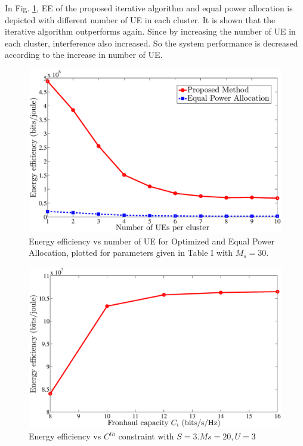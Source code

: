 \documentclass[conference,10pt,twocolumn,letter]{IEEEtran}
\begin{document}
In Fig. \ref{fig:nem2}, EE of the proposed iterative algorithm and equal power allocation is depicted with different number of UE in each cluster. It is shown that the iterative algorithm outperforms  again.
Since by increasing the number of UE in each cluster, interference also increased. So the system performance is decreased according to the increase in number of UE.  
  \begin{figure}
  \centering
    \includegraphics[width=\columnwidth]{ue}
  \caption{Energy efficiency vs number of UE for Optimized and Equal Power Allocation, plotted for parameters given in Table I with $M_s=30$.}
  \label{fig:nem2}
\end{figure}
%
%
\begin{figure}
  \centering
    \includegraphics[width=\columnwidth]{c}
  \caption{Energy efficiency vs ${C}^{th} $ constraint with $S =3.Ms= 20, U =3$ }
  \label{fig:nem3}
\end{figure}
\end{document}
